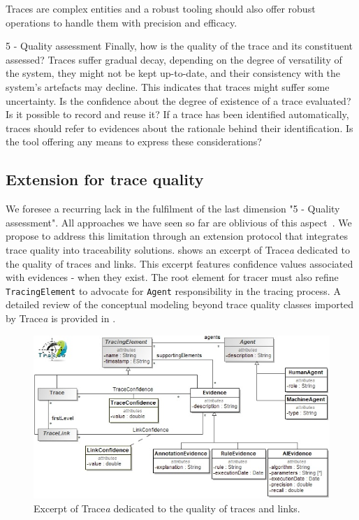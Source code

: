 \begin{descriptioncompact}
    Traces are complex entities and a robust tooling should also offer robust operations to handle them with precision and efficacy.
    
    \item[5 - Quality assessment] Finally, how is the quality of the trace and its constituent assessed? Traces suffer gradual decay, depending on the degree of versatility of the system, they might not be kept up-to-date, and their consistency with the system's artefacts may decline. This indicates that traces might suffer some uncertainty. Is the confidence about the degree of existence of a trace evaluated? Is it possible to record and reuse it? If a trace has been identified automatically, traces should refer to evidences about the rationale behind their identification. Is the tool offering any means to express these considerations?
\end{descriptioncompact}
 

\subsection{Extension for trace quality}\label{sec:protocol-extension}
We foresee a recurring lack in the fulfilment of the last dimension "5 - Quality assessment". All approaches we have seen so far are oblivious of this aspect~\cite{deliverable2,batot2020-survey-driven-feature-model}. We propose to address this limitation through an extension protocol that integrates trace quality into traceability solutions.  shows an excerpt of Trace\textit{a} dedicated to the quality of traces and links. This excerpt features confidence values associated with evidences - when they exist. The root element for tracer must also refine \texttt{TracingElement} to advocate for \texttt{Agent} responsibility in the tracing process. A detailed review of {the conceptual modeling beyond trace quality classes} imported by Trace\textit{a} is provided in \cite{batot2021-not-another-metamodel}.

\begin{figure}[h]     
	\centering
	\includegraphics[width=.99\linewidth]{images/mm-explainability.jpg}
	\caption{Excerpt of Trace\textit{a} dedicated to the quality of traces and links.}
	\label{fig:mm-explainability}
\end{figure}


